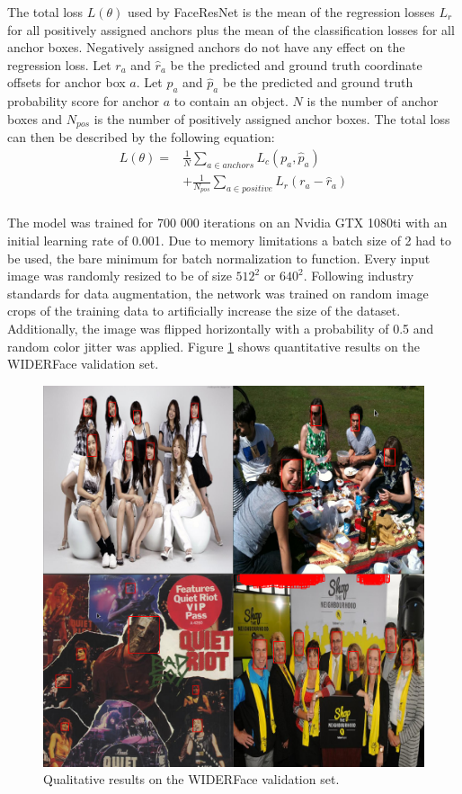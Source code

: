\documentclass[a4paper,11pt,twoside]{article}
\begin{document}
The total loss $L(\theta)$ used by FaceResNet is the mean of the regression losses $L_r$ for all positively assigned anchors plus the mean of the classification losses for all anchor boxes. Negatively assigned anchors do not have any effect on the regression loss. Let $r_a$ and $\hat{r}_a$ be the predicted and ground truth coordinate offsets for anchor box $a$. Let $p_a$ and $\hat{p}_a$ be the predicted and ground truth probability score for anchor $a$ to contain an object. $N$ is the number of anchor boxes and $N_{pos}$ is the number of positively assigned anchor boxes. The total loss can then be described by the following equation:
\begin{equation}
\begin{split}
	L(\theta) = &  \frac{1}{N} \sum_{a \in anchors} L_c(p_a, \hat{p}_a) \\
	& + \frac{1}{N_{pos}} \sum_{a \in positive} L_r(r_a - \hat{r}_a)  \\ 
\end{split}
\end{equation}

The model was trained for 700 000 iterations on an Nvidia GTX 1080ti with an initial learning rate of 0.001. Due to memory limitations a batch size of 2 had to be used, the bare minimum for batch normalization to function. Every input image was randomly resized to be of size $512^2$ or $640^2$. Following industry standards for data augmentation, the network was trained on random image crops of the training data to artificially increase the size of the dataset. Additionally, the image was flipped horizontally with a probability of 0.5 and random color jitter was applied. Figure \ref{faceresults} shows quantitative results on the WIDERFace validation set.

\begin{figure}[h]
	\centering
  		\includegraphics[scale=0.42]{results1.png}
  	\caption{Qualitative results on the WIDERFace validation set.}\label{faceresults}
\end{figure}
\end{document}
